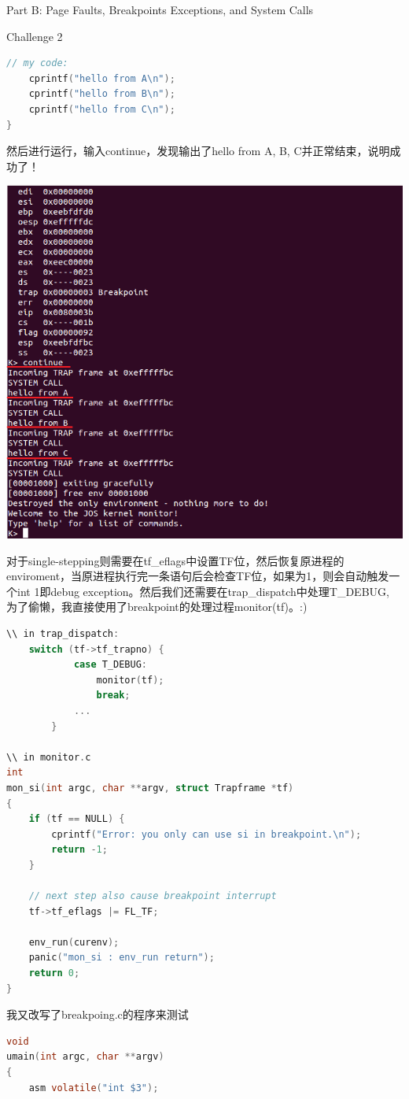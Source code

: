 \documentclass[GBK,winfonts,a4paper,10pt]{ctexart}
\begin{document}
\begin{section}{ Part B: Page Faults, Breakpoints Exceptions, and System Calls }
\begin{subsection}{ Challenge 2 }
\begin{lstlisting}[language=C]
    // my code:
    cprintf("hello from A\n");
    cprintf("hello from B\n");
 	cprintf("hello from C\n");   
}
\end{lstlisting}
\par
然后进行运行，输入continue，发现输出了hello from A, B, C并正常结束，说明成功了！ \par
\includegraphics[scale=0.5]{continue.png}

\par
对于single-stepping则需要在tf\_eflags中设置TF位，然后恢复原进程的enviroment，当原进程执行完一条语句后会检查TF位，如果为1，则会自动触发一个int 1即debug exception。然后我们还需要在trap\_dispatch中处理T\_DEBUG, 为了偷懒，我直接使用了breakpoint的处理过程monitor(tf)。:) 
\par
\begin{lstlisting}[language=C]
\\ in trap_dispatch:
    switch (tf->tf_trapno) {
    		case T_DEBUG:
    			monitor(tf);
    			break;
    		...
    	}
    	
\\ in monitor.c
int 
mon_si(int argc, char **argv, struct Trapframe *tf)
{
    if (tf == NULL) {
        cprintf("Error: you only can use si in breakpoint.\n");
        return -1;
    }

    // next step also cause breakpoint interrupt
    tf->tf_eflags |= FL_TF;

    env_run(curenv);
    panic("mon_si : env_run return");
    return 0;
}
\end{lstlisting}
\par
我又改写了breakpoing.c的程序来测试
\par
\begin{lstlisting}[language=C]
void
umain(int argc, char **argv)
{
	asm volatile("int $3");


\end{lstlisting}
\end{subsection}
\end{section}
\end{document}
